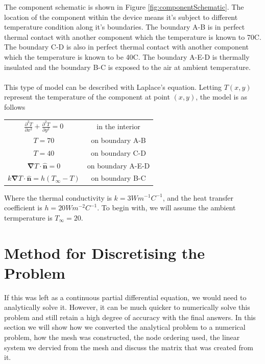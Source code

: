 \documentclass[12pt,a4paper]{article}
\begin{document}
The component schematic is shown in Figure \ref{fig:componentSchematic}. The location of the component within the device means it's subject to different temperature condition along it's boundaries. The boundary A-B is in perfect thermal contact with another component which the temperature is known to 70\degree C. The boundary C-D is also in perfect thermal contact with another component which the temperature is known to be 40\degree C. The boundary A-E-D is thermally insulated and the boundary B-C is exposed to the air at ambient temperature.
\\\\
This type of model can be described with Laplace's equation. Letting $T(x,y)$ represent the temperature of the component at point $(x, y)$, the model is as follows	

\begin{center}
\begin{tabular}{c c}
$\frac{\partial^2 T}{\partial x^2}+\frac{\partial^2 T}{\partial y^2}=0$ & in the interior\\
$T = 70$ & on boundary A-B \\
$T = 40$ & on boundary C-D \\
$\boldsymbol{\nabla} T \cdot {\hat{\textbf{n}}} = 0$ & on boundary A-E-D\\
$k\boldsymbol{\nabla}T\cdot\hat{\textbf{n}} = h(T_{\infty} - T)$ & on boundary B-C
\end{tabular}
\end{center}
Where the thermal conductivity is $k=3Wm^{-1}C^{-1}$, and the heat transfer coefficient is $h=20 Wm^{-2}C^{-1}$. To begin with, we will assume the ambient termperature is $T_\infty = 20$.
\clearpage
\section{Method for Discretising the Problem}
If this was left as a continuous partial differential equation, we would need to analytically solve it. However, it can be much quicker to numerically solve this problem and still retain a high degree of accuracy with the final answers. In this section we will show how we converted the analytical problem to a numerical problem, how the mesh was constructed, the node ordering used, the linear system we dervied from the mesh and discuss the matrix that was created from it.
\end{document}
